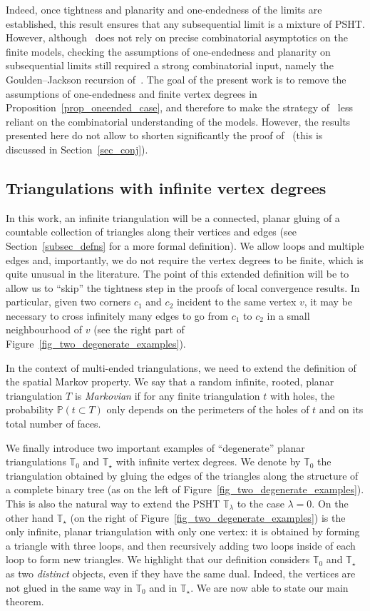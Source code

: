 \documentclass[AHL,Unicode,longabstracts,published]{cedram}
\newcommand{\TT}{\mathbb{T}}
\renewcommand{\P}{\mathbb{P}}
\begin{document}
Indeed, once tightness and planarity and one-endedness of the limits are established, this result ensures that any subsequential limit is a mixture of PSHT. However, although~\cite{BL19} does not rely on precise combinatorial asymptotics on the finite models, checking the assumptions of one-endedness and planarity on subsequential limits still required a strong combinatorial input, namely the Goulden--Jackson recursion of~\cite{GJ08}. The goal of the present work is to remove the assumptions of one-endedness and finite vertex degrees in Proposition~\ref{prop_oneended_case}, and therefore to make the strategy of~\cite{BL19} less reliant on the combinatorial understanding of the models. However, the results presented here do not allow to shorten significantly the proof of~\cite{BL19} (this is discussed in Section~\ref{sec_conj}).

\subsection*{Triangulations with infinite vertex degrees}
In this work, an infinite triangulation will be a connected, planar gluing of a countable collection of triangles along their vertices and edges (see Section~\ref{subsec_defns} for a more formal definition). We allow loops and multiple edges and, importantly, we do not require the vertex degrees to be finite, which is quite unusual in the literature. The point of this extended definition will be to allow us to ``skip'' the tightness step in the proofs of local convergence results. In particular, given two corners $c_1$ and $c_2$ incident to the same vertex $v$, it may be necessary to cross infinitely many edges to go from $c_1$ to $c_2$ in a small neighbourhood of $v$ (see the right part of Figure~\ref{fig_two_degenerate_examples}).

In the context of multi-ended triangulations, we need to extend the definition of the spatial Markov property. We say that a random infinite, rooted, planar triangulation $T$ is \emph{Markovian} if for any finite triangulation $t$ with holes, the probability $\P (t \subset T)$ only depends on the perimeters of the holes of $t$ and on its total number of faces.

We finally introduce two important examples of ``degenerate'' planar triangulations $\TT_0$ and $\TT_{\star}$ with infinite vertex degrees. We denote by $\TT_0$ the triangulation obtained by gluing the edges of the triangles along the structure of a complete binary tree (as on the left of Figure~\ref{fig_two_degenerate_examples}). This is also the natural way to extend the PSHT $\TT_{\lambda}$ to the case $\lambda=0$. On the other hand $\TT_{\star}$ (on the right of Figure~\ref{fig_two_degenerate_examples}) is the only infinite, planar triangulation with only one vertex: it is obtained by forming a triangle with three loops, and then recursively adding two loops inside of each loop to form new triangles. We highlight that our definition considers $\TT_0$ and $\TT_{\star}$ as two \emph{distinct} objects, even if they have the same dual. Indeed, the vertices are not glued in the same way in $\TT_0$ and in $\TT_{\star}$. We are now able to state our main theorem.
\end{document}
